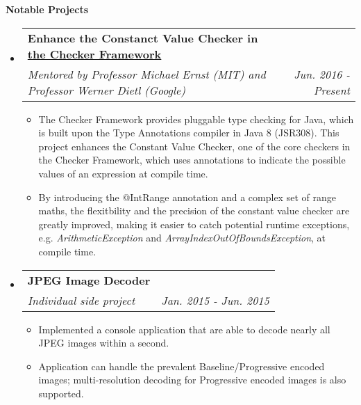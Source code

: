 \documentclass[letterpaper,10pt]{article}
\makeatletter
\newcommand{\resitem}[1]{\item #1 \vspace{-2pt}}
\newcommand{\resheading}[1]{{\large \colorbox{mygrey}{\begin{minipage}{\textwidth}{\textbf{#1 \vphantom{p\^{E}}}}\end{minipage}}}}
\newcommand{\ressubheading}[4]{
\begin{tabular*}{7.0in}{l@{\extracolsep{\fill}}r}
		\textbf{#1} & #2 \\
		\textit{#3} & \textit{#4} \\
\end{tabular*}\vspace{-6pt}}
\makeatother
\begin{document}
\resheading{Notable Projects}
\begin{itemize}
\itemsep0em
\item
	\ressubheading{Enhance the Constanct Value Checker in \href{https://github.com/typetools/checker-framework}{the Checker Framework}}{}{Mentored by Professor Michael Ernst (MIT) and Professor Werner Dietl (Google)}{Jun. 2016 - Present}
	\begin{itemize}
        \resitem{The Checker Framework provides pluggable type checking for Java, which is built upon the Type Annotations compiler in Java 8 (JSR308). This project enhances the Constant Value Checker, one of the core checkers in the Checker Framework, which uses annotations to indicate the possible values of an expression at compile time.}
        \resitem{By introducing the @IntRange annotation and a complex set of range maths, the flexitbility and the precision of the constant value checker are greatly improved, making it easier to catch potential runtime exceptions, e.g. \textit{ArithmeticException} and \textit{ArrayIndexOutOfBoundsException}, at compile time.}
	\end{itemize}
\item
	\ressubheading{JPEG Image Decoder}{}{Individual side project}{Jan. 2015 - Jun. 2015}
	\begin{itemize}
		\resitem{Implemented a console application that are able to decode nearly all JPEG images within a second.}
        \resitem{Application can handle the prevalent Baseline/Progressive encoded images; multi-resolution decoding for Progressive encoded images is also supported.}
	\end{itemize}
	
\end{itemize}
\end{document}
